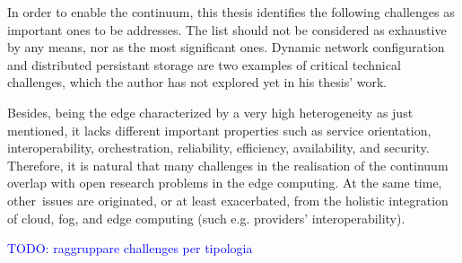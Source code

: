 In order to enable the continuum, this thesis identifies the following challenges as important ones to be addresses. The list should not be considered as exhaustive by any means, nor as the most significant ones. Dynamic network configuration and distributed persistant storage are two examples of critical technical challenges, which the author has not explored yet in his thesis' work.

Besides, being the edge characterized by a very high heterogeneity as just mentioned, it lacks different important properties such as service orientation, interoperability, orchestration, reliability, efficiency, availability, and security. Therefore, it is natural that many challenges in the realisation of the continuum overlap with open research problems in the edge computing. At the same time, other issues are originated, or at least exacerbated, from the holistic integration of cloud, fog, and edge computing (such e.g. providers' interoperability).

\textcolor{blue}{TODO: raggruppare challenges per tipologia}

